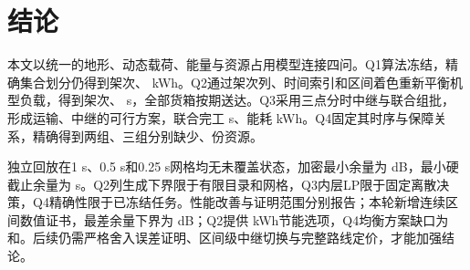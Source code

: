 \section{结论}
本文以统一的地形、动态载荷、能量与资源占用模型连接四问。Q1算法冻结，精确集合划分仍得到\QOneTrips{}架次、\QOneEnergy{} kWh。Q2通过架次列、时间索引和区间着色重新平衡机型负载，得到\QTwoTrips{}架次、\QTwoTime{} s，全部货箱按期送达。Q3采用三点分时中继与联合组批，形成\QThreeTrips{}运输、\RelayTrips{}中继的可行方案，联合完工\JointTime{} s、能耗\JointEnergy{} kWh。Q4固定其时序与保障关系，精确得到两组、三组分别缺少\GapTwo{}、\GapThree{}份资源。

独立回放在1 s、0.5 s和0.25 s网格均无未覆盖状态，加密最小余量为\MarginHalf{} dB，最小硬截止余量为\HardSlack{} s。Q2列生成下界限于有限目录和网格，Q3内层LP限于固定离散决策，Q4精确性限于已冻结任务。性能改善与证明范围分别报告；本轮新增连续区间数值证书，最差余量下界为\ContinuousMargin{} dB；Q2提供\EnergyChoiceEnergy{} kWh节能选项，Q4均衡方案缺口为\BalancedGapTwo{}和\BalancedGapThree{}。后续仍需严格舍入误差证明、区间级中继切换与完整路线定价，才能加强结论。
